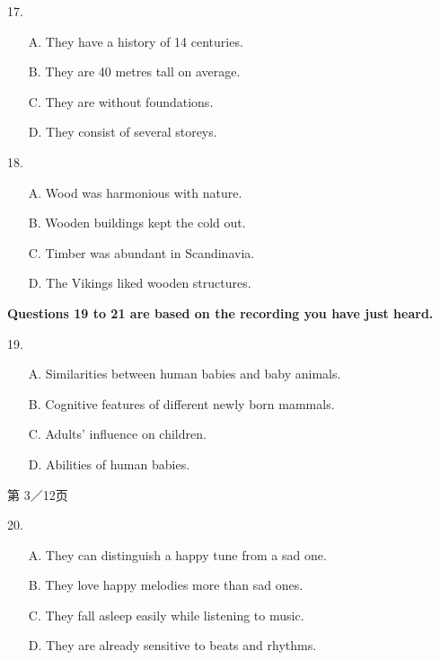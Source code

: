 \documentclass[UTF8,11pt]{ctexart}
\begin{document}
17.


\begin{itemize}[leftmargin=2em,itemsep=.2em,topsep=.4em]\item[A.] They have a history of 14 centuries.
\item[B.] They are 40 metres tall on average.
\item[C.] They are without foundations.
\item[D.] They consist of several storeys.
\end{itemize}

18.


\begin{itemize}[leftmargin=2em,itemsep=.2em,topsep=.4em]\item[A.] Wood was harmonious with nature.
\end{itemize}

\begin{itemize}[leftmargin=2em,itemsep=.2em,topsep=.4em]\item[B.] Wooden buildings kept the cold out.
\item[C.] Timber was abundant in Scandinavia.
\item[D.] The Vikings liked wooden structures.
\end{itemize}

\textbf{Questions 19 to 21 are based on the recording you have just heard.}


19.


\begin{itemize}[leftmargin=2em,itemsep=.2em,topsep=.4em]\item[A.] Similarities between human babies and baby animals.
\item[B.] Cognitive features of different newly born mammals.
\item[C.] Adults' influence on children.
\item[D.] Abilities of human babies.
\end{itemize}

第 3／12页


20.


\begin{itemize}[leftmargin=2em,itemsep=.2em,topsep=.4em]\item[A.] They can distinguish a happy tune from a sad one.
\item[B.] They love happy melodies more than sad ones.
\item[C.] They fall asleep easily while listening to music.
\item[D.] They are already sensitive to beats and rhythms.
\end{itemize}
\end{document}
